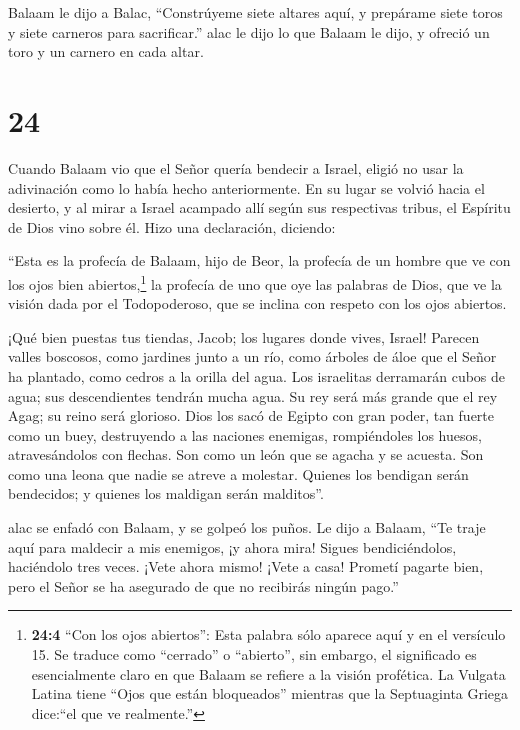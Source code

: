  Balaam le dijo a Balac, ``Constrúyeme siete altares aquí,
y prepárame siete toros y siete carneros para sacrificar.''
 alac le dijo lo que Balaam le dijo, y ofreció un toro y un
carnero en cada altar.

\hypertarget{section-23}{%
\section{24}\label{section-23}}

 Cuando Balaam vio que el Señor quería bendecir a Israel,
eligió no usar la adivinación como lo había hecho anteriormente. En su
lugar se volvió hacia el desierto,  y al mirar a Israel
acampado allí según sus respectivas tribus, el Espíritu de Dios vino
sobre él.  Hizo una declaración, diciendo:

 ``Esta es la profecía de Balaam, hijo de Beor, la profecía
de un hombre que ve con los ojos bien abiertos,\footnote{\textbf{24:4}
  ``Con los ojos abiertos'': Esta palabra sólo aparece aquí y en el
  versículo 15. Se traduce como ``cerrado'' o ``abierto'', sin embargo,
  el significado es esencialmente claro en que Balaam se refiere a la
  visión profética. La Vulgata Latina tiene ``Ojos que están
  bloqueados'' mientras que la Septuaginta Griega dice:``el que ve
  realmente.''} la profecía de uno que oye las palabras de Dios, que ve
la visión dada por el Todopoderoso, que se inclina con respeto con los
ojos abiertos.

 ¡Qué bien puestas tus tiendas, Jacob; los lugares donde
vives, Israel!  Parecen valles boscosos, como jardines junto
a un río, como árboles de áloe que el Señor ha plantado, como cedros a
la orilla del agua.  Los israelitas derramarán cubos de
agua; sus descendientes tendrán mucha agua. Su rey será más grande que
el rey Agag; su reino será glorioso.  Dios los sacó de
Egipto con gran poder, tan fuerte como un buey, destruyendo a las
naciones enemigas, rompiéndoles los huesos, atravesándolos con flechas.
 Son como un león que se agacha y se acuesta. Son como una
leona que nadie se atreve a molestar. Quienes los bendigan serán
bendecidos; y quienes los maldigan serán malditos''.

 alac se enfadó con Balaam, y se golpeó los puños. Le dijo
a Balaam, ``Te traje aquí para maldecir a mis enemigos, ¡y ahora mira!
Sigues bendiciéndolos, haciéndolo tres veces.  ¡Vete ahora
mismo! ¡Vete a casa! Prometí pagarte bien, pero el Señor se ha asegurado
de que no recibirás ningún pago.''

